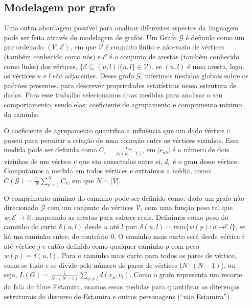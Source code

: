 \documentclass[11pt]{article}
\begin{document}
\subsection{Modelagem por grafo}\vspace{-0.1cm}
Uma outra abordagem possível para analisar diferentes aspectos da linguagem pode ser feita através de modelagem de grafos. Um Grafo $\mathcal{G}$ é definido como um par ordenado $\left \langle \mathcal{V}, \mathcal{E} \right \rangle $, em que $\mathcal{V}$ é conjunto finito e não-vazio de vértices (também conhecido como nós) e $\mathcal{E}$ é o conjunto de arestas (também conhecido como links) dos vértices, $\{\mathcal{E} \subseteq  (u, l) | \{u, l\} \in \mathcal{V}\}$, se $(u, l)$ é uma aresta, logo, os vértices $u$ e $l$ são adjacentes. Desse grafo $\mathcal{G}$, inferimos medidas globais sobre os padrões presentes, para descrever propriedades estatísticas nessa estrutura de dados. Para esse trabalho selecionamos duas medidas para analisar o seu comportamento, sendo elas: coeficiente de agrupamento e comprimento mínimo do caminho


O coeficiente de agrupamento quantifica a influência que um dado vértice $v$ possui para permitir a criação de uma conexão entre os vértices vizinhos. Essa medida pode ser definida como $C_v = \frac{e_{uk}}{d_{v}(d_{v}-1)}$, em $|e_{uk}|$ é o número de dois vizinhos de um vértice $v$ que são conectados entre si, $d_v$ é o grau desse vértice. Computamos a medida em todos vértices e extraímos a média, como: $C(\mathcal{G}) = \frac{1}{N} \sum_{v=1}^{N} C_v$, em que $N = |V|$.  

O comprimento mínimo do caminho pode ser definido como: dado um grafo não direcionado $\mathcal{G}$ com um conjunto de vértices $\mathcal{V}$, com uma função peso tal que $w : \mathcal{E} \to \mathbb{R}$, mapeando as arestas para valores reais. Definimos como peso do caminho do curto $\delta(u, l)$ desde $u$ até $l$ por: $\delta (u, l) = min \{w(p): u \to^{p} l\}$, se há um caminho entre, do contrário $0$. O caminho mais curto será desde vértice $i$ até vértice $j$ e então definido como qualquer caminho $p$ com peso $w (p) = \delta (u, l)$. Para o caminho mais curto para todos os pares de vértice, soma-se tudo e se divide pelo número de pares de vértices ($N \cdot (N - 1)$), ou seja, $L(G) = \frac{1}{N \cdot (N-1)} \sum_{u\neq l} d(v_u, v_l)$. Como o grafo representa um recorte da fala do filme Estamira, usamos essas medidas para quantificar as diferenças estruturais do discurso de Estamira e outros personagens (“não Estamira”). 
\end{document}
